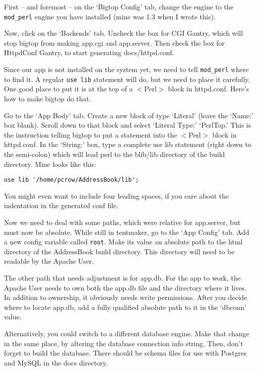 First -- and foremost -- on the `Bigtop Config' tab, change the engine to
the \verb+mod_perl+ engine you have installed (mine was 1.3 when I wrote this).

Now, click on the `Backends' tab.  Uncheck the box for CGI Gantry, which will
stop bigtop from making app.cgi and app.server.  Then check the box for
HttpdConf Gantry, to start generating docs/httpd.conf.

Since our app is not installed on the system yet, we need to tell
\verb+mod_perl+ where to find it.  A regular \verb+use lib+ statement will do,
but we need to place it carefully.  One good place to put it is at the top
of a $<$Perl$>$ block in httpd.conf.  Here's how to make bigtop do that.

Go to the `App Body' tab.  Create a new block of type `Literal' (leave the
`Name:' box blank).  Scroll down to that block and select `Literal Type:'
`PerlTop.'  This is the instruction telling bigtop to put a statement into
the $<$Perl$>$ block in httpd.conf.  In the `String:' box, type a complete
use lib statement (right down to the semi-colon) which will lead perl to the
blib/lib directory of the build directory.  Mine looks like this:

\begin{verbatim}
use lib '/home/pcrow/AddressBook/lib';
\end{verbatim}

You might even want to include four leading spaces, if you care about the
indentation in the generated conf file.

Now we need to deal with some paths, which were relative for app.server,
but must now be absolute.  While still in tentmaker, go to the `App Config'
tab.  Add a new config variable called \verb+root+.  Make its value
an absolute path to the html directory of the AddressBook build directory.
This directory will need to be readable by the Apache User.

The other path that needs adjustment is for app.db.  For the app to work,
the Apache User needs to own both the app.db file and the directory where
it lives.  In addition to ownership, it obviously needs write permissions.
After you decide where to locate app.db, add a fully qualified absolute path
to it in the `dbconn' value.

Alternatively, you could switch to a different database engine.  Make that
change in the same place, by altering the database connection info string.
Then, don't forget to build the database.  There should be schema files
for use with Postgres and MySQL in the docs directory.

